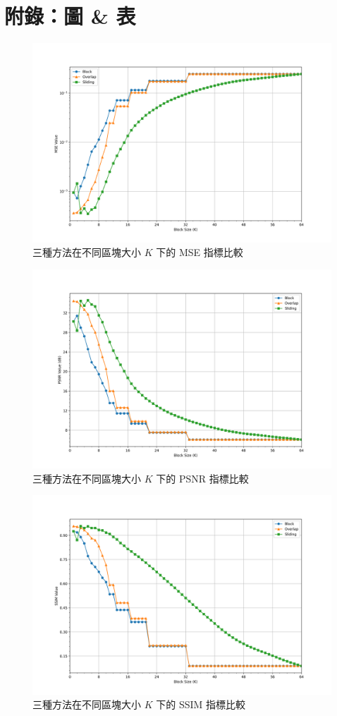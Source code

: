 \documentclass[a4paper,  10pt, oneside, fleqn]{article}
\begin{document}

\newpage

\section*{附錄：圖 \& 表}

\begin{figure}[h]
    \centering
    \includegraphics[width=.75\textwidth]{plots/mse.png}
    \caption{三種方法在不同區塊大小 $K$ 下的 MSE 指標比較}
    \label{fig:plot-mse}
\end{figure}

\begin{figure}[h]
    \centering
    \includegraphics[width=.75\textwidth]{plots/psnr.png}
    \caption{三種方法在不同區塊大小 $K$ 下的 PSNR 指標比較}
    \label{fig:plot-psnr}
\end{figure}

\begin{figure}[h]
    \centering
    \includegraphics[width=.75\textwidth]{plots/ssim.png}
    \caption{三種方法在不同區塊大小 $K$ 下的 SSIM 指標比較}
    \label{fig:plot-ssim}
\end{figure}
\end{document}
